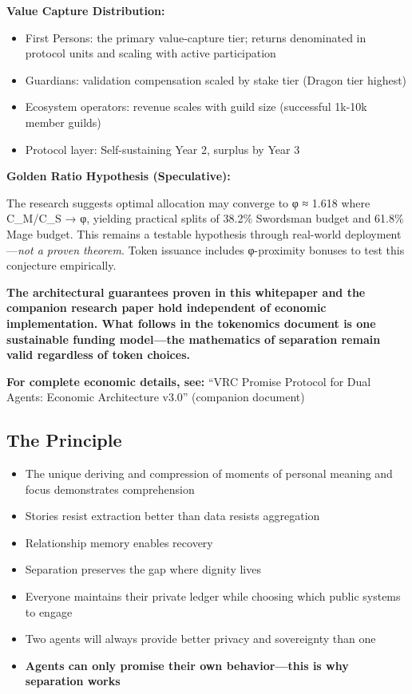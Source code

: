 \documentclass[
]{article}
\begin{document}
\textbf{Value Capture Distribution:}

\begin{itemize}
\item
  First Persons: the primary value-capture tier; returns denominated in
  protocol units and scaling with active participation
\item
  Guardians: validation compensation scaled by stake tier (Dragon tier
  highest)
\item
  Ecosystem operators: revenue scales with guild size (successful 1k-10k
  member guilds)
\item
  Protocol layer: Self-sustaining Year 2, surplus by Year 3
\end{itemize}

\textbf{Golden Ratio Hypothesis (Speculative):}

The research suggests optimal allocation may converge to φ ≈ 1.618 where
C\_M/C\_S → φ, yielding practical splits of 38.2\% Swordsman budget and
61.8\% Mage budget. This remains a testable hypothesis through
real-world deployment---\emph{not a proven theorem}. Token issuance
includes φ-proximity bonuses to test this conjecture empirically.

\textbf{The architectural guarantees proven in this whitepaper and the
companion research paper hold independent of economic implementation.
What follows in the tokenomics document is one sustainable funding
model---the mathematics of separation remain valid regardless of token
choices.}

\textbf{For complete economic details, see:} ``VRC Promise Protocol for
Dual Agents: Economic Architecture v3.0'' (companion document)

\subsection{The Principle}\label{the-principle}

\begin{itemize}
\item
  The unique deriving and compression of moments of personal meaning and
  focus demonstrates comprehension
\item
  Stories resist extraction better than data resists aggregation
\item
  Relationship memory enables recovery
\item
  Separation preserves the gap where dignity lives
\item
  Everyone maintains their private ledger while choosing which public
  systems to engage
\item
  Two agents will always provide better privacy and sovereignty than one
\item
  \textbf{Agents can only promise their own behavior---this is why
  separation works}
\end{itemize}
\end{document}
